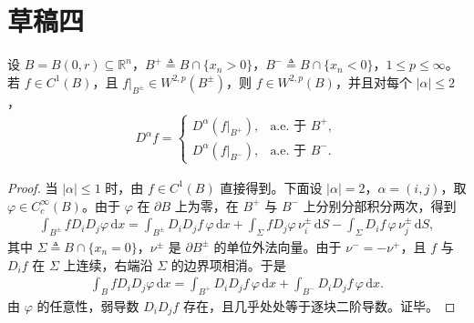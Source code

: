 \documentclass[../../main.tex]{subfiles}%
\begin{document}
\section{草稿四}

\begin{lemma}[片状函数的弱二阶导数]\label{lemma:ch05-piecewise-W2p}
设 $B=B(0,r)\subseteq\mathbb{R}^{n}$，$B^{+}\triangleq B\cap\{x_n>0\}$，$B^{-}\triangleq B\cap\{x_n<0\}$，$1\leqslant p\leqslant\infty$。若 $f\in C^{1}(B)$，且 $f|_{B^{\pm}}\in W^{2,p}(B^{\pm})$，则 $f\in W^{2,p}(B)$，并且对每个 $|\alpha|\leqslant2$，
\begin{align*}
D^{\alpha}f=
\begin{cases}
D^{\alpha}(f|_{B^{+}}), & \text{a.e. 于 }B^{+},\\
D^{\alpha}(f|_{B^{-}}), & \text{a.e. 于 }B^{-}.
\end{cases}
\end{align*}
\end{lemma}
\begin{proof}
当 $|\alpha|\leqslant1$ 时，由 $f\in C^{1}(B)$ 直接得到。下面设 $|\alpha|=2$，$\alpha=(i,j)$，取 $\varphi\in C_{c}^{\infty}(B)$。由于 $\varphi$ 在 $\partial B$ 上为零，在 $B^{+}$ 与 $B^{-}$ 上分别分部积分两次，得到
\begin{align*}
\int_{B^{\pm}}fD_iD_j\varphi\,\mathrm{d}x
=\int_{B^{\pm}}D_iD_jf\,\varphi\,\mathrm{d}x
+\int_{\Sigma}fD_j\varphi\,\nu_i^{\pm}\,\mathrm{d}S
-\int_{\Sigma}D_if\,\varphi\,\nu_j^{\pm}\,\mathrm{d}S,
\end{align*}
其中 $\Sigma\triangleq B\cap\{x_n=0\}$，$\nu^{\pm}$ 是 $\partial B^{\pm}$ 的单位外法向量。由于 $\nu^{-}=-\nu^{+}$，且 $f$ 与 $D_if$ 在 $\Sigma$ 上连续，右端沿 $\Sigma$ 的边界项相消。于是
\begin{align*}
\int_{B}fD_iD_j\varphi\,\mathrm{d}x
=\int_{B^{+}}D_iD_jf\,\varphi\,\mathrm{d}x
+\int_{B^{-}}D_iD_jf\,\varphi\,\mathrm{d}x.
\end{align*}
由 $\varphi$ 的任意性，弱导数 $D_iD_jf$ 存在，且几乎处处等于逐块二阶导数。证毕。
\end{proof}
\end{document}
